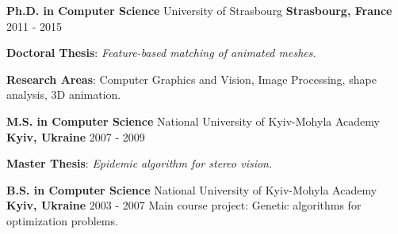 

\begin{cventries}

  \cventry
    {\textbf{Ph.D. in Computer Science}} %
    {University of Strasbourg} %
    {\textbf{Strasbourg, France}} %
    {2011 - 2015} %
    {
      \begin{cvitems} %
        \item{\textbf{Doctoral Thesis}: \textit{Feature-based matching of animated meshes.}}
        \item{\textbf{Research Areas}: Computer Graphics and Vision, Image Processing, shape analysis, 3D animation.}
      \end{cvitems}
    }
    
  \cventry
    {\textbf{M.S. in Computer Science}} %
    {National University of Kyiv-Mohyla Academy} %
    {\textbf{Kyiv, Ukraine}} %
    {2007 - 2009} %
	{      
	  \begin{cvitems} %
        \item {\textbf{Master Thesis}: \textit{Epidemic algorithm for stereo vision.}}
      \end{cvitems}}
	
 \cventry
   {\textbf{B.S. in Computer Science}} %
   {National University of Kyiv-Mohyla Academy} %
   {\textbf{Kyiv, Ukraine}} %
   {2003 - 2007} %
   {Main course project: Genetic algorithms for optimization problems.}

\end{cventries}